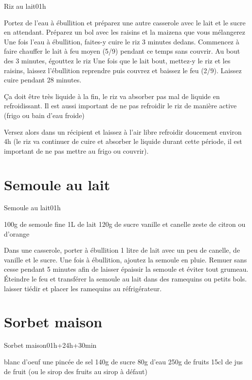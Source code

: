 {\begin{recette}{Riz au lait}{0}{1h}{}
\begin{preparation}
\etape Portez de l'eau à ébullition et préparez une autre casserole avec le lait et le sucre en attendant.
\etape Préparez un bol avec les raisins et la maizena que vous mélangerez
\etape Une fois l'eau à ébullition, faites-y cuire le riz 3 minutes dedans. Commencez à faire chauffer le lait à feu moyen (5/9) pendant ce temps sans couvrir. 
\etape Au bout des 3 minutes, égouttez le riz
\etape Une fois que le lait bout, mettez-y le riz et les raisins, laissez l'ébullition reprendre puis couvrez et baissez le feu (2/9). Laissez cuire pendant 28 minutes. 
\begin{remarque}
Ça doit être très liquide à la fin, le riz va absorber pas mal de liquide en refroidissant. Il est aussi important de ne pas refroidir le riz de manière active (frigo ou bain d'eau froide)
\end{remarque}
\etape Versez alors dans un récipient et laissez à l'air libre refroidir doucement environ 4h (le riz va continuer de cuire et absorber le liquide durant cette période, il est important de ne pas mettre au frigo ou couvrir).
\end{preparation}
\end{recette}

\section{Semoule au lait}
\begin{recette}{Semoule au lait}{0}{1h}{}
\begin{ingredients}[4 pers.]
\ingredient 100g de semoule fine
\ingredient 1L de lait
\ingredient 120g de sucre
\ingredient vanille et canelle
\ingredient zeste de citron ou d'orange
\end{ingredients}

\begin{preparation}
\etape Dans une casserole, porter à ébullition 1 litre de lait avec un peu de canelle, de vanille et le sucre. Une fois à ébullition, ajoutez la semoule en pluie.
\etape Remuer sans cesse pendant 5 minutes afin de laisser épaissir la semoule et éviter tout grumeau.
\etape Éteindre le feu et transférer la semoule au lait dans des ramequins ou petits bols. laisser tiédir et placer les ramequins au réfrigérateur.
\end{preparation}
\end{recette}

\section{Sorbet maison}
\begin{recette}{Sorbet maison}{0}{1h+24h+30min}{}
\begin{ingredients}
 blanc d'oeuf
\ingredient une pincée de sel
\ingredient 140g de sucre
\ingredient 80g d'eau
\ingredient 250g de fruits
\ingredient 15cl de jus de fruit (ou le sirop des fruits au sirop à défaut)
\end{ingredients}


\end{recette}}
